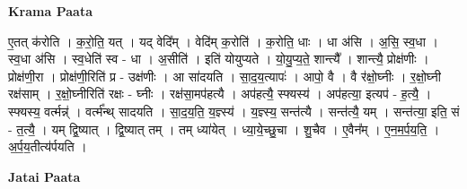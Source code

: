 \documentclass[17pt]{extarticle}
\begin{document}
\textbf{Krama Paata} \newline

ए॒तत् क॑रोति । क॒रो॒ति॒ यत् । यद् वेदि᳚म् । वेदि॑म् क॒रोति॑ । क॒रोति॒ धाः । धा अ॑सि । अ॒सि॒ स्व॒धा । स्व॒धा अ॑सि । स्व॒धेति॑ स्व - धा । अ॒सीति॑ । इति॑ योयुप्यते । यो॒यु॒प्य॒ते॒ शान्त्यै᳚ । शान्त्यै॒ प्रोक्ष॑णीः । प्रोक्ष॑णी॒रा । प्रोक्ष॑णी॒रिति॑ प्र - उक्ष॑णीः । आ सा॑दयति । सा॒द॒य॒त्यापः॑ । आपो॒ वै । वै र॑क्षो॒घ्नीः । र॒क्षो॒घ्नी रक्ष॑साम् । र॒क्षो॒घ्नीरिति॑ रक्षः - घ्नीः । रक्ष॑सा॒मप॑हत्यै । अप॑हत्यै॒ स्फ्यस्य॑ । अप॑हत्या॒ इत्यप॑ - ह॒त्यै॒ । स्फ्यस्य॒ वर्त्मन्न्॑ । वर्त्म᳚न्थ् सादयति । सा॒द॒य॒ति॒ य॒ज्ञ्स्य॑ । य॒ज्ञ्स्य॒ सन्त॑त्यै । सन्त॑त्यै॒ यम् । सन्त॑त्या॒ इति॒ सं - त॒त्यै॒ । यम् द्वि॒ष्यात् । द्वि॒ष्यात् तम् । तम् ध्या॑येत् । ध्या॒ये॒च्छु॒चा । शु॒चैव । ए॒वैन᳚म् । ए॒न॒म॒र्प॒य॒ति॒ । अ॒र्प॒य॒तीत्य॑र्पयति । \newline

\textbf{Jatai Paata} \newline
\end{document}
